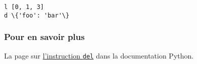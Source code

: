     \begin{Verbatim}[commandchars=\\\{\}]
l [0, 1, 3]
d \{'foo': 'bar'\}

    \end{Verbatim}

    \hypertarget{pour-en-savoir-plus}{%
\subsubsection{Pour en savoir plus}\label{pour-en-savoir-plus}}

    La page sur
\href{https://docs.python.org/3/reference/simple_stmts.html\#the-del-statement}{l'instruction
\texttt{del}} dans la documentation Python.


    
    
    
